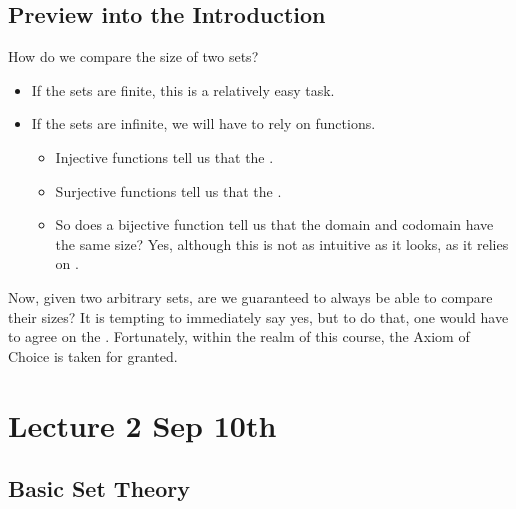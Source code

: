 \documentclass[notoc,notitlepage]{tufte-book}
\begin{document}

\section{Preview into the Introduction}%
\label{sec:preview_into_the_introduction}

How do we compare the size of two sets?

\begin{itemize}
  \item If the sets are finite, this is a relatively easy task.
  \item If the sets are infinite, we will have to rely on functions.
    \begin{itemize}
      \item Injective functions tell us that the .
      \item Surjective functions tell us that the .
      \item So does a bijective function tell us that the domain and codomain have the same size? Yes, although this is not as intuitive as it looks, as it relies on .
    \end{itemize}
\end{itemize}

Now, given two arbitrary sets, are we guaranteed to always be able to compare their sizes? It is tempting to immediately say yes, but to do that, one would have to agree on the . Fortunately, within the realm of this course, the Axiom of Choice is taken for granted.



\chapter{Lecture 2 Sep 10th}%
\label{chp:lecture_2_sep_10th}

\section{Basic Set Theory}%
\label{sec:basic_set_theory}
\end{document}
